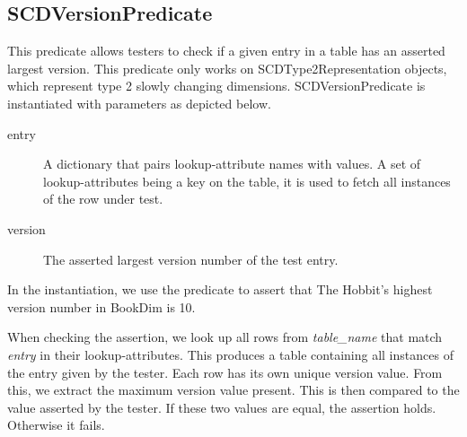\subsection{SCDVersionPredicate}\label{SCD}

This predicate allows testers to check if a given entry in a table has an asserted largest version. This predicate only works on SCDType2Representation objects, which represent type 2 slowly changing dimensions. SCDVersionPredicate is instantiated with parameters as depicted below.


\begin{description}
\item [entry] A dictionary that pairs lookup-attribute names with values. A set of lookup-attributes being a key on the table, it is used to fetch all instances of the row under test.  
\item [version] The asserted largest version number of the test entry.
\end{description}

In the instantiation, we use the predicate to assert that The Hobbit's highest version number in BookDim is 10.

When checking the assertion, we look up all rows from \textit{table_name} that match \textit{entry} in their lookup-attributes. This produces a table containing all instances of the entry given by the tester. Each row has its own unique version value. From this, we extract the maximum version value present. This is then compared to the value asserted by the tester. If these two values are equal, the assertion holds. Otherwise it fails.